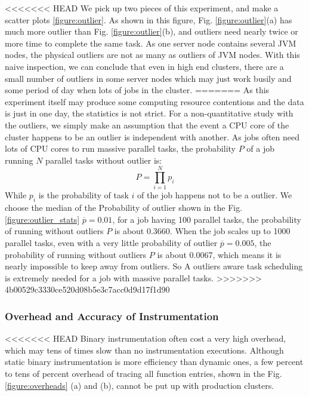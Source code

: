 <<<<<<< HEAD
We pick up two pieces of this experiment, and make a scatter plots \ref{figure:outlier}. As shown in this figure, Fig.  \ref{figure:outlier}(a) has much more outlier than Fig.  \ref{figure:outlier}(b), and outliers need nearly twice or more time to complete the same task. As one server node contains several JVM nodes, the physical outliers are not as many as outliers of JVM nodes. With this naive inspection, we can conclude that even in high end clusters, there are a small number of outliers in some server nodes which may just work busily and some period of day when lots of jobs in the cluster.
=======
As this experiment itself may produce some computing resource contentions and the data is just in one day, the statistics is not strict. For a non-quantitative study with the outliers, we simply make an assumption that the event a CPU core of the cluster happens to be an outlier is independent with another. As jobs often need lots of CPU cores to run massive parallel tasks, the probability $P$ of a job running $N$ parallel tasks without outlier is:
$$P = \prod_{i=1}^N p_i$$
While $p_i$ is the probability of task $i$ of the job happens not to be a outlier. We choose the median of the Probability of outlier shown in the Fig. \ref{figure:outlier_stats} $\overline{p} = 0.01$, for a job having 100 parallel tasks, the probability of running without outliers $P$ is about 0.3660. When the job scales up to 1000 parallel tasks, even with a very little probability of outlier $\overline{p} = 0.005$, the probability of running without outliers $P$ is about 0.0067, which means it is nearly impossible to keep away from outliers. So A outliers aware task scheduling is extremely needed for a job with massive parallel tasks.
>>>>>>> 4b00529c3330ce520d08b5e3c7acc0d9d17f1d90

\subsubsection{Overhead and Accuracy of Instrumentation}

<<<<<<< HEAD
Binary instrumentation often cost a very high overhead, which may tens of times slow than no instrumentation executions. Although static binary instrumentation is more efficiency than dynamic ones, a few percent to tens of percent overhead of tracing all function entries, shown in the Fig. \ref{figure:overheads} (a) and (b), cannot be put up with production clusters.

